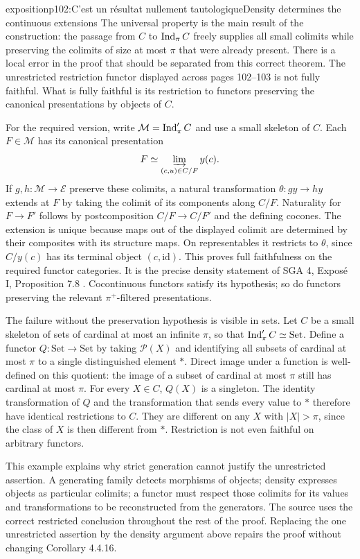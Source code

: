 \begin{dcomment}{exposition}{p102:C'est un résultat nullement tautologique}{Density determines the continuous extensions}
The universal property is the main result of the construction: the passage from $C$ to $\operatorname{Ind}_\pi C$ freely supplies all small colimits while preserving the colimits of size at most $\pi$ that were already present. There is a local error in the proof that should be separated from this correct theorem. The unrestricted restriction functor displayed across pages 102--103 is not fully faithful. What is fully faithful is its restriction to functors preserving the canonical presentations by objects of $C$.

For the required version, write $\mathcal M=\operatorname{Ind}'_\pi C$ and use a small skeleton of $C$. Each $F\in\mathcal M$ has its canonical presentation
\[
F\simeq\varinjlim_{(c,u)\in C/F}y(c).
\]
If $g,h:\mathcal M\to\mathcal E$ preserve these colimits, a natural transformation $\theta:g y\to h y$ extends at $F$ by taking the colimit of its components along $C/F$. Naturality for $F\to F'$ follows by postcomposition $C/F\to C/F'$ and the defining cocones. The extension is unique because maps out of the displayed colimit are determined by their composites with its structure maps. On representables it restricts to $\theta$, since $C/y(c)$ has its terminal object $(c,\mathrm{id})$. This proves full faithfulness on the required functor categories. It is the precise density statement of SGA 4, Expos\'e I, Proposition 7.8 \citep{SGA4I1972}. Cocontinuous functors satisfy its hypothesis; so do functors preserving the relevant $\pi^+$-filtered presentations.

The failure without the preservation hypothesis is visible in sets. Let $C$ be a small skeleton of sets of cardinal at most an infinite $\pi$, so that $\operatorname{Ind}'_\pi C\simeq\mathrm{Set}$. Define a functor $Q:\mathrm{Set}\to\mathrm{Set}$ by taking $\mathcal P(X)$ and identifying all subsets of cardinal at most $\pi$ to a single distinguished element $*$. Direct image under a function is well-defined on this quotient: the image of a subset of cardinal at most $\pi$ still has cardinal at most $\pi$. For every $X\in C$, $Q(X)$ is a singleton. The identity transformation of $Q$ and the transformation that sends every value to $*$ therefore have identical restrictions to $C$. They are different on any $X$ with $|X|>\pi$, since the class of $X$ is then different from $*$. Restriction is not even faithful on arbitrary functors.

This example explains why strict generation cannot justify the unrestricted assertion. A generating family detects morphisms of objects; density expresses objects as particular colimits; a functor must respect those colimits for its values and transformations to be reconstructed from the generators. The source uses the correct restricted conclusion throughout the rest of the proof. Replacing the one unrestricted assertion by the density argument above repairs the proof without changing Corollary 4.4.16.
\end{dcomment}


